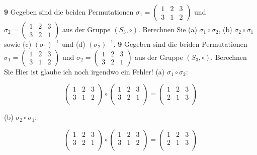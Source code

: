 \documentclass[11pt]{article}
\begin{document}
    \textbf{9} Gegeben sind die beiden Permutationen \(\sigma_{1} = \begin{pmatrix} 1 & 2 & 3 \\ 3 & 1 & 2 \end{pmatrix}\) und \(\sigma_{2} = \begin{pmatrix} 1 & 2 & 3 \\ 3 & 2 & 1 \end{pmatrix}\) aus der Gruppe \( (S_3, \circ) \). Berechnen Sie (a) \(\sigma_{1} \circ \sigma_{2}\), (b) \(\sigma_{2} \circ \sigma_{1}\) sowie (c) \((\sigma_{1})^{-1}\) und (d) \((\sigma_{2})^{-1}\).
\textbf{9} Gegeben sind die beiden Permutationen \(\sigma_{1} = \begin{pmatrix} 1 & 2 & 3 \\ 3 & 1 & 2 \end{pmatrix}\) und \(\sigma_{2} = \begin{pmatrix} 1 & 2 & 3 \\ 3 & 2 & 1 \end{pmatrix}\) aus der Gruppe \( (S_3, \circ) \). Berechnen Sie
\newline\newline\newline Hier ist glaube ich noch irgendwo ein Fehler!\newline
(a) \(\sigma_{1} \circ \sigma_{2}\):

\[
    \begin{pmatrix}
        1 & 2 & 3 \\
        3 & 1 & 2 \\
    \end{pmatrix}
    \circ
    \begin{pmatrix}
        1 & 2 & 3 \\
        3 & 2 & 1 \\
    \end{pmatrix}
    =
    \begin{pmatrix}
        1 & 2 & 3 \\
        2 & 1 & 3 \\
    \end{pmatrix}
\]

(b) \(\sigma_{2} \circ \sigma_{1}\):

\[
    \begin{pmatrix}
        1 & 2 & 3 \\
        3 & 2 & 1 \\
    \end{pmatrix}
    \circ
    \begin{pmatrix}
        1 & 2 & 3 \\
        3 & 1 & 2 \\
    \end{pmatrix}
    =
    \begin{pmatrix}
        1 & 2 & 3 \\
        2 & 1 & 3 \\
    \end{pmatrix}
\]
\end{document}

